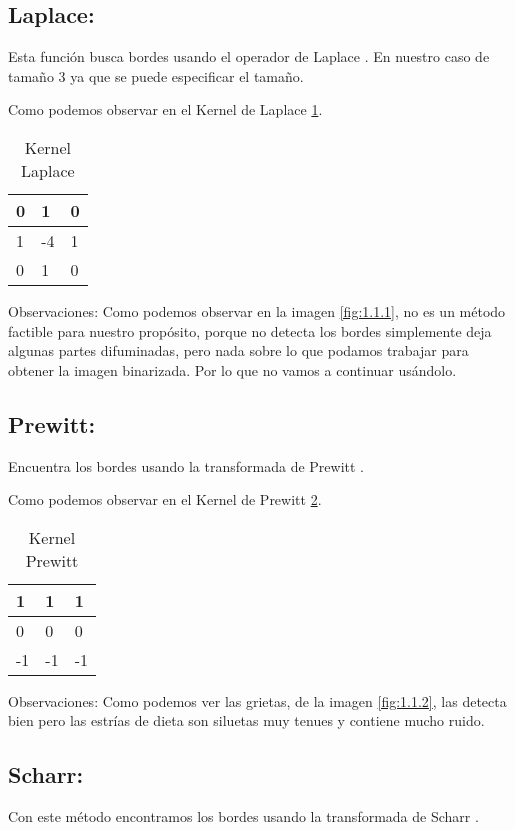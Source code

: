 \subsection{Laplace:}
Esta función busca bordes usando el operador de Laplace \cite{wiki:Laplace}. En nuestro caso de tamaño 3 ya que se puede especificar el tamaño.

Como podemos observar en el Kernel de Laplace \ref{F_k1}.
\begin{table}[]
	\centering
	\caption{Kernel Laplace}
	\label{F_k1}
	\begin{tabular}{|l|l|l|}
		\hline
		0 & 1  & 0 \\ \hline
		1 & -4 & 1 \\ \hline
		0 & 1  & 0 \\ \hline
	\end{tabular}
\end{table}

Observaciones:
Como podemos observar en la imagen \ref{fig:1.1.1}, no es un método factible para nuestro propósito, porque no detecta los bordes simplemente deja algunas partes difuminadas, pero nada sobre lo que podamos trabajar para obtener la imagen binarizada. Por lo que no vamos a continuar usándolo.

\subsection{Prewitt:}

Encuentra los bordes usando la transformada de Prewitt \cite{wiki:Prewitt}.

Como podemos observar en el Kernel de Prewitt \ref{F_k2}.
\begin{table}[]
	\centering
	\caption{Kernel Prewitt}
	\label{F_k2}
	\begin{tabular}{|l|l|l|}
		\hline
		1  & 1   & 1 \\ \hline
		0  & 0   & 0 \\ \hline
		-1 & -1  & -1 \\ \hline
	\end{tabular}
\end{table}



Observaciones:
Como podemos ver las grietas, de la imagen \ref{fig:1.1.2}, las detecta bien pero las estrías de dieta son siluetas muy tenues y contiene mucho ruido.


\subsection{Scharr:}
Con este método encontramos los bordes usando la transformada de Scharr \cite{wiki:Scharr}.

